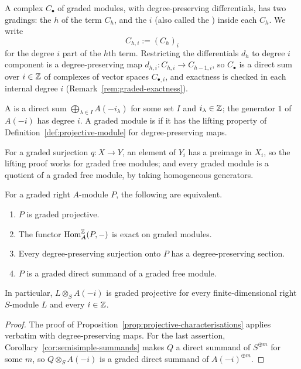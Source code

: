 \begin{notation}\label{not:bigrading}
A complex $C_\bullet$ of graded modules, with degree-preserving differentials, has two gradings: the  $h$ of the term $C_h$, and the  $i$ (also called the ) inside each $C_h$.
We write
\[
C_{h,i}:=(C_h)_i
\]
for the degree $i$ part of the $h$th term.
Restricting the differentials $d_h$ to degree $i$ component is a degree-preserving map $d_{h,i}:C_{h,i}\to C_{h-1,i}$, so $C_\bullet$ is a direct sum over $i\in\mathbb{Z}$ of complexes of vector spaces $C_{\bullet,i}$, and exactness is checked in each internal degree $i$ (Remark~\ref{rem:graded-exactness}).
\end{notation}

\begin{definition}\label{def:graded-projective}
A  is a direct sum $\bigoplus_{\lambda\in I}A(-i_\lambda)$ for some set $I$ and $i_\lambda\in\mathbb{Z}$; the generator $1$ of $A(-i)$ has degree $i$.
A graded module is  if it has the lifting property of Definition~\ref{def:projective-module} for degree-preserving maps.
\end{definition}

For a graded surjection $q:X\to Y$, an element of $Y_i$ has a preimage in $X_i$, so the lifting proof works for graded free modules; and every graded module is a quotient of a graded free module, by taking homogeneous generators.

\begin{corollary}\label{cor:graded-projective-characterisations}
For a graded right $A$-module $P$, the following are equivalent.
\begin{enumerate}
\item $P$ is graded projective.
\item The functor $\operatorname{Hom}\nolimits_A^{\mathbb{Z}}(P,-)$ is exact on graded modules.
\item Every degree-preserving surjection onto $P$ has a degree-preserving section.
\item $P$ is a graded direct summand of a graded free module.
\end{enumerate}
In particular, $L\otimes_S A(-i)$ is graded projective for every finite-dimensional right $S$-module $L$ and every $i\in\mathbb{Z}$.
\end{corollary}

\begin{proof}
The proof of Proposition~\ref{prop:projective-characterisations} applies verbatim with degree-preserving maps.
For the last assertion, Corollary~\ref{cor:semisimple-summands} makes $Q$ a direct summand of $S^{\oplus m}$ for some $m$, so $Q\otimes_S A(-i)$ is a graded direct summand of $A(-i)^{\oplus m}$.
\end{proof}

